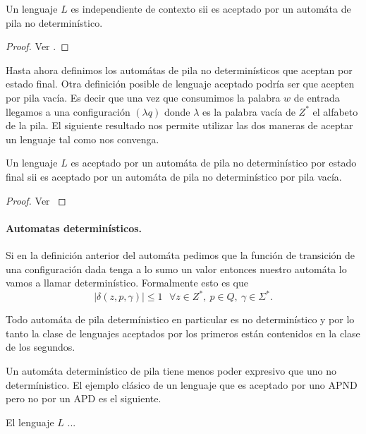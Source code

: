 \documentclass[tesis.tex]{subfiles}
\begin{document}
\medskip
\begin{teo}
Un lenguaje $L$ es independiente de contexto sii es aceptado por un automáta de pila no determinístico.
\end{teo}

\begin{proof}
	Ver \cite{}.
\end{proof}

Hasta ahora definimos los automátas de pila no determinísticos que aceptan por estado final. Otra definición posible de lenguaje aceptado podría ser que acepten por pila vacía. Es decir que una vez que consumimos la palabra $w$ de entrada llegamos a una configuración $(\lambda q)$ donde $\lambda$ es la palabra vacía de $Z^*$ el alfabeto de la pila. El siguiente resultado nos permite utilizar las dos maneras de aceptar un lenguaje tal como nos convenga.

\medskip
\begin{teo}
Un lenguaje $L$ es aceptado por un automáta de pila no determinístico por estado final sii es aceptado por un automáta de pila no determinístico por pila vacía.
\end{teo}

\begin{proof}
	Ver \cite{}
\end{proof}

\paragraph{Automatas determinísticos.} Si en la definición anterior del automáta pedimos que la función de transición de una configuración dada tenga a lo sumo un valor entonces nuestro automáta lo vamos a llamar determinístico. Formalmente esto es que 
\[
|\delta(z,p,\gamma)| \le 1 \ \ \ \forall z \in Z^*, \ p \in Q, \ \gamma \in \Sigma^{*}.
\]

\begin{obs}
	Todo automáta de pila determínistico en particular es no determinístico y por lo tanto la clase de lenguajes aceptados por los primeros están contenidos en la clase de los segundos.
\end{obs}

Un automáta determinístico de pila tiene menos poder expresivo que uno no determínistico. El ejemplo clásico de un lenguaje que es aceptado por uno APND pero no por un APD es el siguiente.

\begin{ej}
	El lenguaje $L$ ...
\end{ej}
\end{document}
